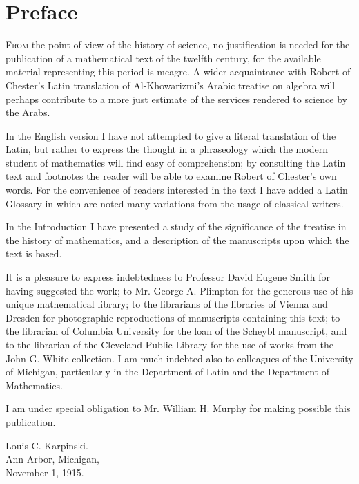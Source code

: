 \documentclass[11pt,a4paper,twoside]{book}
\begin{document}
\chapter*{Preface}

\lettrine[lines=3]{F}{rom} the point of view of the history of science, no justification is needed for the publication of a mathematical text of the twelfth century, for the available material representing this period is meagre. A wider acquaintance with Robert of Chester's Latin translation of Al-Khowarizmi's Arabic treatise on algebra will perhaps contribute to a more just estimate of the services rendered to science by the Arabs.

In the English version I have not attempted to give a literal translation of the Latin, but rather to express the thought in a phraseology which the modern student of mathematics will find easy of comprehension; by consulting the Latin text and footnotes the reader will be able to examine Robert of Chester's own words. For the convenience of readers interested in the text I have added a Latin Glossary in which are noted many variations from the usage of classical writers.

In the Introduction I have presented a study of the significance of the treatise in the history of mathematics, and a description of the manuscripts upon which the text is based.

It is a pleasure to express indebtedness to Professor David Eugene Smith for having suggested the work; to Mr. George A. Plimpton for the generous use of his unique mathematical library; to the librarians of the libraries of Vienna and Dresden for photographic reproductions of manuscripts containing this text; to the librarian of Columbia University for the loan of the Scheybl manuscript, and to the librarian of the Cleveland Public Library for the use of works from the John G. White collection. I am much indebted also to colleagues of the University of Michigan, particularly in the Department of Latin and the Department of Mathematics.

I am under special obligation to Mr. William H. Murphy for making possible this publication.

\begin{flushright}
Louis C. Karpinski.\\
Ann Arbor, Michigan,\\
November 1, 1915.
\end{flushright}
\end{document}
